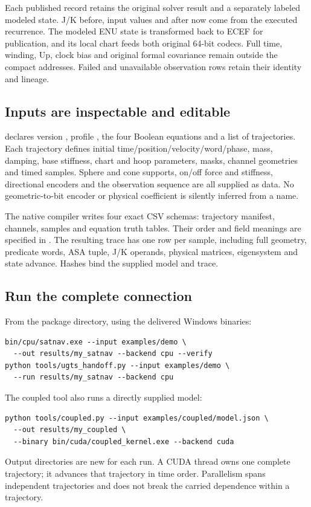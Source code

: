 Each published record retains the original solver result and a separately labeled
modeled state. J/K before, input values and after now come from the executed
recurrence. The modeled ENU state is transformed back to ECEF for publication,
and its local chart feeds both original 64-bit codecs. Full time, winding, Up,
clock bias and original formal covariance remain outside the compact addresses.
Failed and unavailable observation rows retain their identity and lineage.

\subsection{Inputs are inspectable and editable}
 declares version , profile
, the four Boolean equations and a list of trajectories. Each
trajectory defines initial time/position/velocity/word/phase, mass, damping, base
stiffness, chart and hoop parameters, masks, channel geometries and timed samples.
Sphere and cone supports, on/off force and stiffness, directional encoders and
the observation sequence are all supplied as data. No geometric-to-bit encoder
or physical coefficient is silently inferred from a name.

The native compiler writes four exact CSV schemas: trajectory manifest, channels,
samples and equation truth tables. Their order and field meanings are specified
in . The resulting trace has one row per sample,
including full geometry, predicate words, ASA tuple, J/K operands, physical
matrices, eigensystem and state advance. Hashes bind the supplied model and trace.

\subsection{Run the complete connection}
From the package directory, using the delivered Windows binaries:
\begin{lstlisting}
bin/cpu/satnav.exe --input examples/demo \
  --out results/my_satnav --backend cpu --verify
python tools/ugts_handoff.py --input examples/demo \
  --run results/my_satnav --backend cpu
\end{lstlisting}
The coupled tool also runs a directly supplied model:
\begin{lstlisting}
python tools/coupled.py --input examples/coupled/model.json \
  --out results/my_coupled \
  --binary bin/cuda/coupled_kernel.exe --backend cuda
\end{lstlisting}
Output directories are new for each run. A CUDA thread owns one complete
trajectory; it advances that trajectory in time order. Parallelism spans independent
trajectories and does not break the carried dependence within a trajectory.
\clearpage


